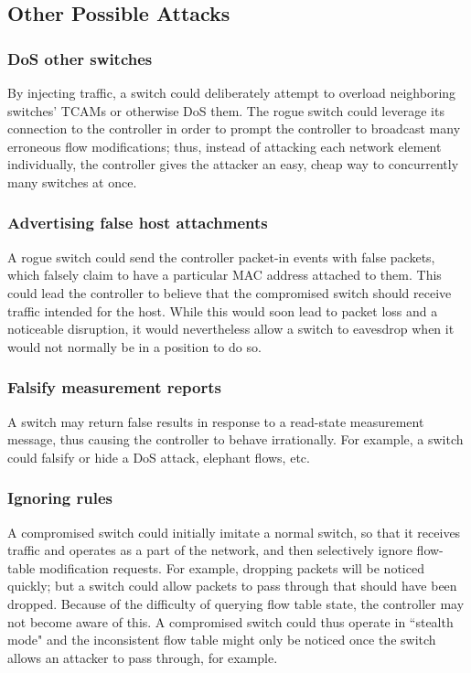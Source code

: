 \subsection{Other Possible Attacks}
\subsubsection{DoS other switches}
By injecting traffic, a switch could deliberately attempt to overload neighboring switches' TCAMs or otherwise DoS them. The rogue switch could leverage its connection to the controller in order to prompt the controller to broadcast many erroneous flow modifications; thus, instead of attacking each network element individually, the controller gives the attacker an easy, cheap way to concurrently many switches at once. 

\subsubsection{Advertising false host attachments}
A rogue switch could send the controller packet-in events with false packets, which falsely claim to have a particular MAC address attached to them. This could lead the controller to believe that the compromised switch should receive traffic intended for the host. While this would soon lead to packet loss and a noticeable disruption, it would nevertheless allow a switch to eavesdrop when it would not normally be in a position to do so.

\subsubsection{Falsify measurement reports}
A switch may return false results in response to a read-state  measurement message, thus causing the controller to behave irrationally. For example, a switch could falsify or hide a DoS attack, elephant flows, etc.

\subsubsection{Ignoring rules}
A compromised switch could initially imitate a normal switch, so that it receives traffic and operates as a part of the network, and then selectively ignore flow-table modification requests. For example, dropping packets will be noticed quickly; but a switch could allow packets to pass through that should have been dropped. Because of the difficulty of querying flow table state, the controller may not become aware of this. A compromised switch could thus operate in ``stealth mode" and the inconsistent flow table might only be noticed once the switch allows an attacker to pass through, for example.

